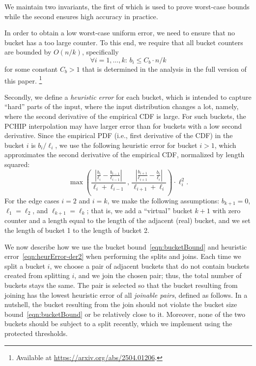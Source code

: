 \documentclass[acmsmall]{acmart}
\theoremstyle{remark}
\begin{document}
We maintain two invariants, the first of which is used to prove worst-case bounds while the second ensures high accuracy in practice.


In order to obtain a low worst-case uniform error, we need to ensure that no bucket has a too large counter.
To this end, we require that all bucket counters are bounded by $O(n/k)$, specifically
\begin{equation}\label{eqn:bucketBound}
	\forall i = 1, \dots, k:\, b_i \leq C_b \cdot n/k	
\end{equation}
for some constant $C_b > 1$
that is determined in the analysis in the full version of this paper. \footnote{Available at \url{https://arxiv.org/abs/2504.01206}.} 

Secondly, we define a \emph{heuristic error} for each bucket, which is intended to capture ``hard'' parts of the input,
where the input distribution changes a lot, namely, where the second derivative of the empirical CDF is large.
For such buckets, the PCHIP interpolation may have larger error than for buckets with a low second derivative.
Since the empirical PDF (i.e., first derivative of the CDF) in the bucket $i$ is $b_i / \ell_i$, we use the following heuristic error for bucket $i > 1$, which approximates the second derivative of the empirical CDF, normalized by length squared:
\begin{equation}\label{eqn:heurError-der2}
    \max\left(
        \frac{\left|\frac{b_i}{\ell_i} - \frac{b_{i-1}}{\ell_{i-1}}\right|}{\ell_i + \ell_{i-1}}
        \,,\,
        \frac{\left|\frac{b_{i+1}}{\ell_{i+1}} - \frac{b_i}{\ell_i}\right|}{\ell_{i+1} + \ell_i}
    \right)
    \cdot \ell_i^2.
\end{equation}
For the edge cases $i=2$ and $i=k$, we make the following assumptions: $b_{k+1} = 0$, 
$\ell_{1} = \ell_2$, and $\ell_{k+1} = \ell_{k}$; that is, we add a ``virtual'' bucket $k+1$
with zero counter and a length equal to the length of the adjacent (real) bucket, and we set the length of bucket 1 to the length of bucket 2.


We now describe how we use the bucket bound~\eqref{eqn:bucketBound} and heuristic error~\eqref{eqn:heurError-der2} when performing the splits and joins. 
Each time we split a bucket $i$, we choose a pair of adjacent buckets that do not  contain buckets created from splitting $i$, and we join the chosen pair; thus, the total number of buckets stays the same.
The pair is selected so that the bucket resulting from joining has the lowest heuristic error of all \emph{joinable pairs}, defined as follows.
In a nutshell, the bucket resulting from the join should not violate the bucket size bound~\eqref{eqn:bucketBound} or be relatively close to it.
Moreover, none of the two buckets should be subject to a split recently,
which we implement using the protected thresholds.
\end{document}
